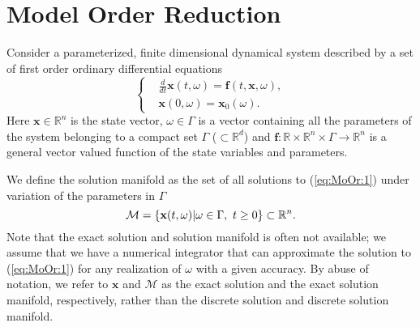 \section{Model Order Reduction} \label{chap:MoOr:1}
Consider a parameterized, finite dimensional dynamical system described by a set of first order ordinary differential equations
\begin{equation} \label{eq:MoOr:1}
\left\{
\begin{split}
& \frac{d}{dt} \mathbf{x}(t,\omega) = \mathbf f (t,\mathbf x,\omega), \\
& \mathbf x(0,\omega) = \mathbf x_0(\omega).
\end{split}
\right.
\end{equation}
Here $\mathbf x \in \mathbb R^n$ is the state vector, $\omega \in \Gamma$ is a vector containing all the parameters of the system {\edit belonging} to a compact set $\Gamma$ ($\subset \mathbb R^d$) and $\mathbf f : \mathbb R \times \mathbb R^n \times \Gamma \to \mathbb R^n$ is a general {\edit vector valued} function of the state variables and parameters.

We define the solution manifold as the set of all solutions to (\ref{eq:MoOr:1}) under variation of {\edit the parameters in $\Gamma$}
\begin{equation} \label{eq:MoOr:2}
	\edit \mathcal M = \{ \mathbf x(t,\omega) | \omega \in \Gamma,\ t\geq 0 \} \subset \mathbb R^n.
\end{equation}
Note that the exact solution and solution manifold is {\edit often not} available; we assume that we have a numerical integrator that can approximate the solution to (\ref{eq:MoOr:1}) for any realization of $\omega$ {\edit with a given accuracy}. By abuse of notation, we refer to $\mathbf x$ and $\mathcal M$ as the exact solution and the exact solution manifold, respectively, rather than the discrete solution and discrete solution manifold. 


